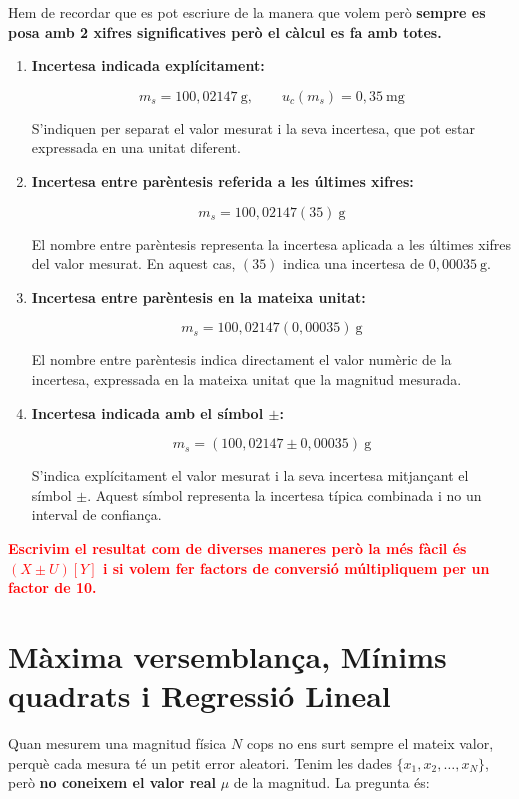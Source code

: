 \documentclass[12pt]{article}
\begin{document}
Hem de recordar que es pot escriure de la manera que volem però \textbf{sempre es posa amb 2 xifres significatives però el càlcul es fa amb totes.}

\begin{enumerate}
    \item \textbf{Incertesa indicada explícitament:}

    \[
    m_s = 100{,}02147\ \text{g},
    \qquad
    u_c(m_s) = 0{,}35\ \text{mg}
    \]

    S'indiquen per separat el valor mesurat i la seva incertesa, que pot estar expressada en una unitat diferent.

    \item \textbf{Incertesa entre parèntesis referida a les últimes xifres:}

    \[
    m_s = 100{,}02147(35)\ \text{g}
    \]

    El nombre entre parèntesis representa la incertesa aplicada a les últimes xifres del valor mesurat. En aquest cas, $(35)$ indica una incertesa de $0{,}00035\ \text{g}$.

    \item \textbf{Incertesa entre parèntesis en la mateixa unitat:}

    \[
    m_s = 100{,}02147(0{,}00035)\ \text{g}
    \]

    El nombre entre parèntesis indica directament el valor numèric de la incertesa, expressada en la mateixa unitat que la magnitud mesurada.

    \item \textbf{Incertesa indicada amb el símbol $\pm$:}

    \[
    m_s = (100{,}02147 \pm 0{,}00035)\ \text{g}
    \]

    S'indica explícitament el valor mesurat i la seva incertesa mitjançant el símbol $\pm$. Aquest símbol representa la incertesa típica combinada i no un interval de confiança.
\end{enumerate}

\textcolor{red}{\textbf{Escrivim el resultat com de diverses maneres però la més fàcil és $(X \pm U)[Y]$ i si volem fer factors de conversió múltipliquem per un factor de 10.}}

\section{Màxima versemblança, Mínims quadrats i Regressió Lineal}

Quan mesurem una magnitud física $N$ cops no ens surt sempre el mateix valor, perquè cada mesura té un petit error aleatori. Tenim les dades $\{x_1, x_2, \dots, x_N\}$, però \textbf{no coneixem el valor real} $\mu$ de la magnitud. La pregunta és:
\end{document}

